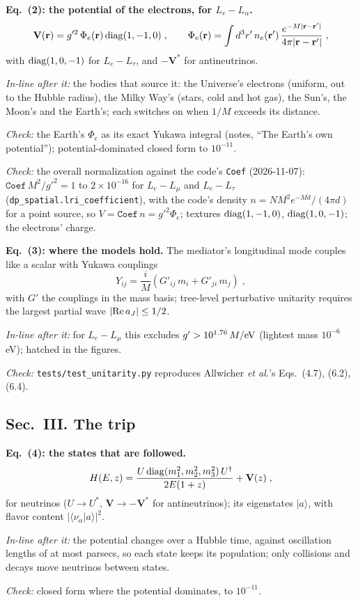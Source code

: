 \documentclass[11pt]{article}
\newcommand{\checked}[1]{\par\noindent\textit{Check:} #1}
\newcommand{\inline}[1]{\par\noindent\textit{In-line after it:} #1}
\begin{document}
\textbf{Eq.~(2): the potential of the electrons, for $L_e - L_\alpha$.}
\begin{equation}
 \mathbf{V}(\mathbf{r}) = g'^2\, \Phi_e(\mathbf{r})\, {\rm diag}(1, -1, 0) \;, \qquad
 \Phi_e(\mathbf{r}) = \int d^3 r'\, n_e(\mathbf{r}')\, \frac{e^{-M |\mathbf{r} - \mathbf{r}'|}}{4\pi |\mathbf{r} - \mathbf{r}'|} \;,
\end{equation}
with ${\rm diag}(1, 0, -1)$ for $L_e - L_\tau$, and $-\mathbf{V}^*$ for antineutrinos.
\inline{the bodies that source it: the Universe's electrons (uniform, out to the Hubble radius), the Milky Way's (stars, cold and hot gas), the Sun's, the Moon's and the Earth's; each switches on when $1/M$ exceeds its distance.}
\checked{the Earth's $\Phi_e$ as its exact Yukawa integral (notes, ``The Earth's own potential''); potential-dominated closed form to $10^{-11}$.}
\checked{the overall normalization against the code's \texttt{Coef} (2026-11-07): $\texttt{Coef}\, M^2/g'^2 = 1$ to $2\times10^{-16}$ for $L_e - L_\mu$ and $L_e - L_\tau$ (\texttt{dp\_spatial.lri\_coefficient}), with the code's density $n = N M^2 e^{-Md}/(4\pi d)$ for a point source, so $V = \texttt{Coef}\, n = g'^2 \Phi_e$; textures ${\rm diag}(1,-1,0)$, ${\rm diag}(1,0,-1)$; the electrons' charge.}

\textbf{Eq.~(3): where the models hold.}
The mediator's longitudinal mode couples like a scalar with Yukawa couplings
\begin{equation}
 Y_{ij} = \frac{i}{M} \left( G'_{ij}\, m_i + G'_{ji}\, m_j \right) \;,
\end{equation}
with $G'$ the couplings in the mass basis; tree-level perturbative unitarity requires the largest partial wave $|{\rm Re}\, a_J| \leq 1/2$.
\inline{for $L_e - L_\mu$ this excludes $g' > 10^{1.76}\, M/{\rm eV}$ (lightest mass $10^{-6}$ eV); hatched in the figures.}
\checked{\texttt{tests/test\_unitarity.py} reproduces Allwicher \textit{et al.}'s Eqs.~(4.7), (6.2), (6.4).}

\subsection*{Sec.~III. The trip}

\textbf{Eq.~(4): the states that are followed.}
\begin{equation}
 H(E, z) = \frac{U\, {\rm diag}(m_1^2, m_2^2, m_3^2)\, U^\dagger}{2E(1+z)} + \mathbf{V}(z) \;,
\end{equation}
for neutrinos ($U \to U^*$, $\mathbf{V} \to -\mathbf{V}^*$ for antineutrinos); its eigenstates $|a\rangle$, with flavor content $|\langle\nu_\alpha|a\rangle|^2$.
\inline{the potential changes over a Hubble time, against oscillation lengths of at most parsecs, so each state keeps its population; only collisions and decays move neutrinos between states.}
\checked{closed form where the potential dominates, to $10^{-11}$.}
\end{document}
